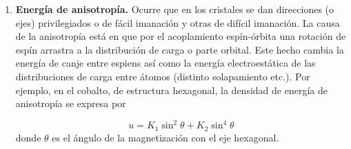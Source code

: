 \begin{enumerate}[label=\alph*)]
	\item \textbf{Energía de anisotropía.} Ocurre que en los cristales se dan direcciones (o ejes) privilegiados o de fácil imanación y otras de difícil imanación. La causa de la anisotropía está en que por el acoplamiento espín-órbita una rotación de espín arrastra a la distribución de carga o parte orbital. Este hecho cambia la energía de canje entre espiens así como la energía electroestática de las distribuciones de carga entre átomos (distinto solapamiento etc.). Por ejemplo, en el cobalto, de estructura hexagonal, la densidad de energía de anisotropía se expresa por 
	
	\begin{equation*}
		u = K_1 \sin^2 \theta + K_2 \sin^4 \theta
	\end{equation*}
	donde $\theta$ es el ángulo de la magnetización con el eje hexagonal.
	

\end{enumerate}

